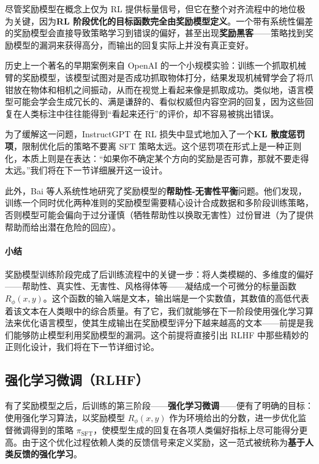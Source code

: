 尽管奖励模型在概念上仅为 RL 提供标量信号，但它在整个对齐流程中的地位极为关键，因为\textbf{RL 阶段优化的目标函数完全由奖励模型定义}。一个带有系统性偏差的奖励模型会直接导致策略学习到错误的偏好，甚至出现\textbf{奖励黑客}——策略找到奖励模型的漏洞来获得高分，而输出的回复实际上并没有真正变好。

历史上一个著名的早期案例来自 OpenAI 的一个小规模实验：训练一个抓取机械臂的奖励模型，该模型试图对是否成功抓取物体打分，结果发现机械臂学会了将爪钳放在物体和相机之间振动，从而在视觉上看起来像是抓取成功\cite{christiano2017deep}。类似地，语言模型可能会学会生成冗长的、满是谦辞的、看似权威但内容空洞的回复，因为这些回复在人类标注中往往能得到“看起来还行”的评价，却不容易被挑出错误。

为了缓解这一问题，InstructGPT 在 RL 损失中显式地加入了一个\textbf{KL 散度惩罚项}，限制优化后的策略不要离 SFT 策略太远。这个惩罚项在形式上是一种正则化，本质上则是在表达：“如果你不确定某个方向的奖励是否可靠，那就不要走得太远。”我们将在下一节详细展开这一设计。

此外，Bai 等人\cite{bai2022traininghelpfulharmlessassistant}系统性地研究了奖励模型的\textbf{帮助性-无害性平衡}问题。他们发现，训练一个同时优化两种准则的奖励模型需要精心设计合成数据和多阶段训练策略，否则模型可能会偏向于过分谨慎（牺牲帮助性以换取无害性）过份冒进（为了提供帮助而给出潜在危险的回应）。

\paragraph{小结}

奖励模型训练阶段完成了后训练流程中的关键一步：将人类模糊的、多维度的偏好——帮助性、真实性、无害性、风格得体等——凝结成一个可微分的标量函数 $R_\phi(x, y)$。这个函数的输入端是文本，输出端是一个实数值，其数值的高低代表着该文本在人类眼中的综合质量。有了它，我们就能够在下一阶段使用强化学习算法来优化语言模型，使其生成输出在奖励模型评分下越来越高的文本——前提是我们能够防止模型利用奖励模型的漏洞。这个前提将直接引出 RLHF 中那些精妙的正则化设计，我们将在下一节详细讨论。

\subsection{强化学习微调（RLHF）}

有了奖励模型之后，后训练的第三阶段——\textbf{强化学习微调}——便有了明确的目标：使用强化学习算法，以奖励模型 $R_\phi(x,y)$ 作为环境给出的分数，进一步优化监督微调得到的策略 $\pi_{\text{SFT}}$，使模型生成的回复在各项人类偏好指标上尽可能得分更高。由于这个优化过程依赖人类的反馈信号来定义奖励，这一范式被统称为\textbf{基于人类反馈的强化学习}。

